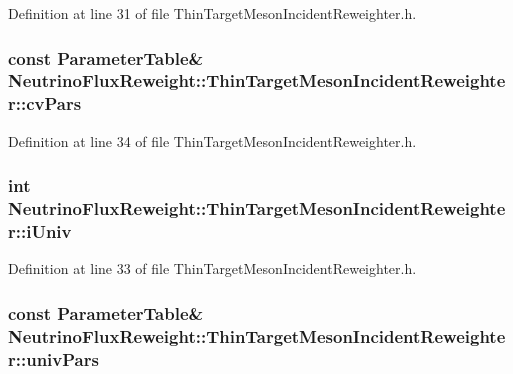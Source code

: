 Definition at line 31 of file Thin\-Target\-Meson\-Incident\-Reweighter.\-h.

\hypertarget{class_neutrino_flux_reweight_1_1_thin_target_meson_incident_reweighter_a1e7d2570076d7f35a84edfd053ef7b54}{
\subsubsection[{cv\-Pars}]{\setlength{\rightskip}{0pt plus 5cm}const {\bf Parameter\-Table}\& Neutrino\-Flux\-Reweight\-::\-Thin\-Target\-Meson\-Incident\-Reweighter\-::cv\-Pars\hspace{0.3cm}{\ttfamily [private]}}}\label{class_neutrino_flux_reweight_1_1_thin_target_meson_incident_reweighter_a1e7d2570076d7f35a84edfd053ef7b54}


Definition at line 34 of file Thin\-Target\-Meson\-Incident\-Reweighter.\-h.

\hypertarget{class_neutrino_flux_reweight_1_1_thin_target_meson_incident_reweighter_aba895e921936f33c25a89daa18c1bf5d}{
\subsubsection[{i\-Univ}]{\setlength{\rightskip}{0pt plus 5cm}int Neutrino\-Flux\-Reweight\-::\-Thin\-Target\-Meson\-Incident\-Reweighter\-::i\-Univ\hspace{0.3cm}{\ttfamily [private]}}}\label{class_neutrino_flux_reweight_1_1_thin_target_meson_incident_reweighter_aba895e921936f33c25a89daa18c1bf5d}


Definition at line 33 of file Thin\-Target\-Meson\-Incident\-Reweighter.\-h.

\hypertarget{class_neutrino_flux_reweight_1_1_thin_target_meson_incident_reweighter_a04e7825e0d90c6a0315028620f2ac511}{
\subsubsection[{univ\-Pars}]{\setlength{\rightskip}{0pt plus 5cm}const {\bf Parameter\-Table}\& Neutrino\-Flux\-Reweight\-::\-Thin\-Target\-Meson\-Incident\-Reweighter\-::univ\-Pars\hspace{0.3cm}{\ttfamily [private]}}}\label{class_neutrino_flux_reweight_1_1_thin_target_meson_incident_reweighter_a04e7825e0d90c6a0315028620f2ac511}


